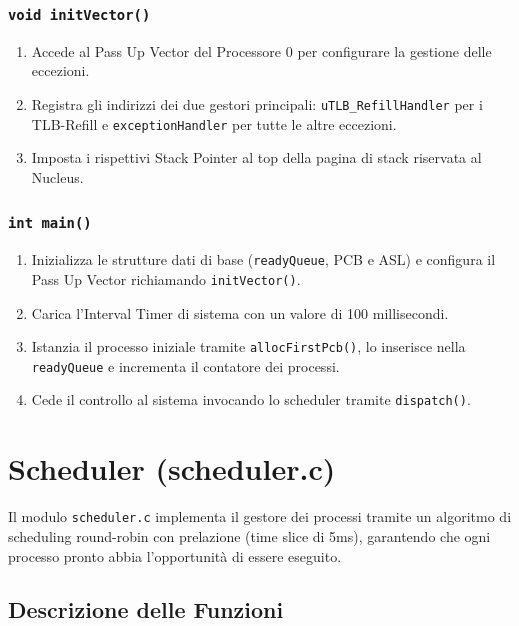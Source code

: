 \documentclass[a4paper,12pt]{article}
\begin{document}
\subsubsection{\texttt{void initVector()}}
\begin{enumerate}
    \item Accede al Pass Up Vector del Processore 0 per configurare la gestione delle eccezioni.
    \item Registra gli indirizzi dei due gestori principali: \texttt{uTLB\_RefillHandler} per i TLB-Refill e \texttt{exceptionHandler} per tutte le altre eccezioni.
    \item Imposta i rispettivi Stack Pointer al top della pagina di stack riservata al Nucleus.
\end{enumerate}

\subsubsection{\texttt{int main()}}
\begin{enumerate}
    \item Inizializza le strutture dati di base (\texttt{readyQueue}, PCB e ASL) e configura il Pass Up Vector richiamando \texttt{initVector()}.
    \item Carica l'Interval Timer di sistema con un valore di 100 millisecondi.
    \item Istanzia il processo iniziale tramite \texttt{allocFirstPcb()}, lo inserisce nella \texttt{readyQueue} e incrementa il contatore dei processi.
    \item Cede il controllo al sistema invocando lo scheduler tramite \texttt{dispatch()}.
\end{enumerate}


\section{Scheduler (scheduler.c)}
Il modulo \texttt{scheduler.c} implementa il gestore dei processi tramite un algoritmo di scheduling round-robin con prelazione (time slice di 5ms), garantendo che ogni processo pronto abbia l'opportunità di essere eseguito.

\vspace{0.5cm}
\subsection{Descrizione delle Funzioni}
\end{document}
